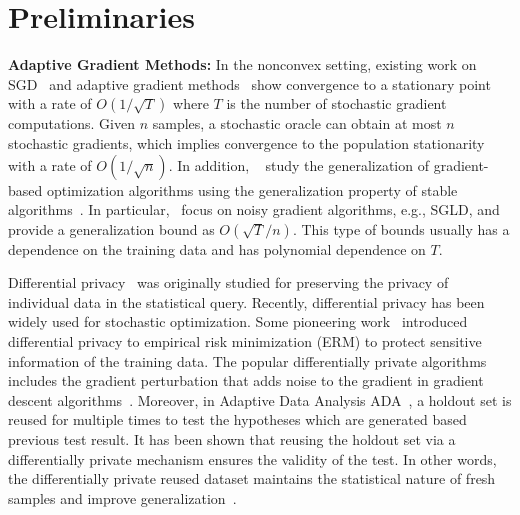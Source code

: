 \documentclass[11pt]{article}
\begin{document}
\vspace{-0.05in}
\section{Preliminaries}
\vspace{-0.05in}

{\bf Adaptive Gradient Methods:} 
In the nonconvex setting, existing work on SGD~\citep{ghla2013} and adaptive gradient methods~\citep{zare18, wawu19, zosh2019, cheli2019} show convergence to a stationary point with a rate of  $O(1/\sqrt{T})$ where $T$ is the number of stochastic gradient computations. Given $n$ samples, a stochastic oracle can obtain at most $n$ stochastic gradients, which implies convergence to the population stationarity with a rate of $O(1/\sqrt{n})$.
In addition, ~\citet{kula2018, rara2017, hare2016,mowa2018, pejo2018, cheli2019, lilu2019} study the generalization of gradient-based optimization algorithms using the generalization property of stable algorithms~\cite{boel02}. 
In particular,~\citet{rara2017, mowa2018, lilu2019, pejo2018} focus on noisy gradient algorithms, e.g., \textsc{SGLD}, and provide a generalization bound as $O(\sqrt{T}/n)$. 
This type of bounds usually has a dependence on the training data and has polynomial dependence on $T$.  

Differential privacy~\cite{dwro2014} was originally studied for preserving the privacy of individual data in the statistical query. 
Recently, differential privacy has been widely used for stochastic optimization. 
Some pioneering work~\citep{chmo2011, basm2014, waye2017} introduced differential privacy to empirical risk minimization (ERM) to protect sensitive information of the training data. 
The popular differentially private algorithms includes the gradient perturbation that adds noise to the gradient in gradient descent algorithms~\citep{chmo2011,basm2014,waxu2019}.
Moreover, in Adaptive Data Analysis \textsc{ADA}~\citep{dwfe2015a,dwfe2015b,dwfe2015c}, a holdout set is reused for multiple times to test the hypotheses which are generated based previous test result.  
It has been shown that reusing the holdout set via a differentially private mechanism ensures the validity of the test. 
In other words, the differentially private reused dataset maintains the statistical nature of fresh samples and improve generalization~\citep{zhch2018}. 
\end{document}
